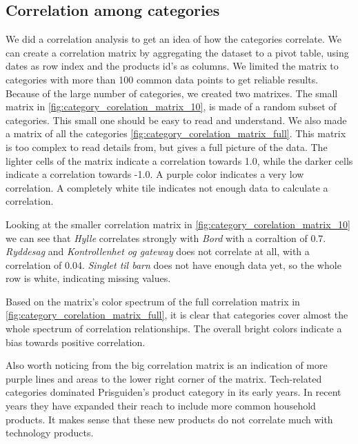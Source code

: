 \subsection{Correlation among categories}
We did a correlation analysis to get an idea of how the categories correlate.
We can create a correlation matrix by aggregating the dataset to a pivot table, using dates as row index and the products id's as columns.
We limited the matrix to categories with more than 100 common data points to get reliable results.
Because of the large number of categories, we created two matrixes. The small matrix in \autoref{fig:category_corelation_matrix_10},
is made of a random subset of categories.
This small one should be easy to read and understand.
We also made a matrix of all the categories \autoref{fig:category_corelation_matrix_full}. This matrix is too complex to read details from, but gives a full picture of the data.
The lighter cells of the matrix indicate a correlation towards 1.0, while the darker cells indicate a correlation towards -1.0.
A purple color indicates a very low correlation.
A completely white tile indicates not enough data to calculate a correlation.

Looking at the smaller correlation matrix in \autoref{fig:category_corelation_matrix_10} we can see that
\textit{Hylle} correlates strongly  with \textit{Bord} with a corraltion of 0.7.
\textit{Ryddesag} and \textit{Kontrollenhet og gateway} does not correlate at all, with a correlation of 0.04.
\textit{Singlet til barn} does not have enough data yet, so the whole row is white, indicating missing values.


Based on the matrix's color spectrum of the full correlation matrix in \autoref{fig:category_corelation_matrix_full}, it is clear that categories cover almost the whole spectrum of correlation relationships.
The overall bright colors indicate a bias towards positive correlation.

Also worth noticing from the big correlation matrix is an indication of more purple lines and areas to the lower right corner of the matrix.
Tech-related categories dominated Prisguiden's product category in its early years. In recent years they have expanded their reach to include more common household
products. It makes sense that these new products do not correlate much with technology products.

